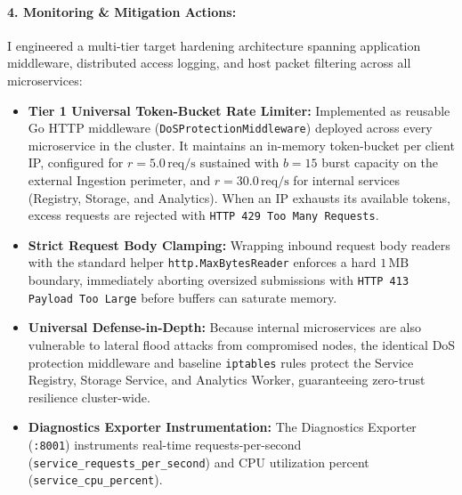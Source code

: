 \paragraph{4. Monitoring \& Mitigation Actions:}
I engineered a multi-tier target hardening architecture spanning application middleware, distributed access logging, and host packet filtering across all microservices:
\begin{itemize}
    \item \textbf{Tier 1 Universal Token-Bucket Rate Limiter:} Implemented as reusable Go HTTP middleware (\texttt{DoSProtectionMiddleware}) deployed across every microservice in the cluster. It maintains an in-memory token-bucket per client IP, configured for $r = 5.0\,\text{req/s}$ sustained with $b = 15$ burst capacity on the external Ingestion perimeter, and $r = 30.0\,\text{req/s}$ for internal services (Registry, Storage, and Analytics). When an IP exhausts its available tokens, excess requests are rejected with \texttt{HTTP 429 Too Many Requests}.
    \item \textbf{Strict Request Body Clamping:} Wrapping inbound request body readers with the standard helper \texttt{http.MaxBytesReader} enforces a hard $1\,\text{MB}$ boundary, immediately aborting oversized submissions with \texttt{HTTP 413 Payload Too Large} before buffers can saturate memory.
    \item \textbf{Universal Defense-in-Depth:} Because internal microservices are also vulnerable to lateral flood attacks from compromised nodes, the identical DoS protection middleware and baseline \texttt{iptables} rules protect the Service Registry, Storage Service, and Analytics Worker, guaranteeing zero-trust resilience cluster-wide.
    \item \textbf{Diagnostics Exporter Instrumentation:} The Diagnostics Exporter (\texttt{:8001}) instruments real-time requests-per-second (\texttt{service\_requests\_per\_second}) and CPU utilization percent (\texttt{service\_cpu\_percent}).
\end{itemize}

